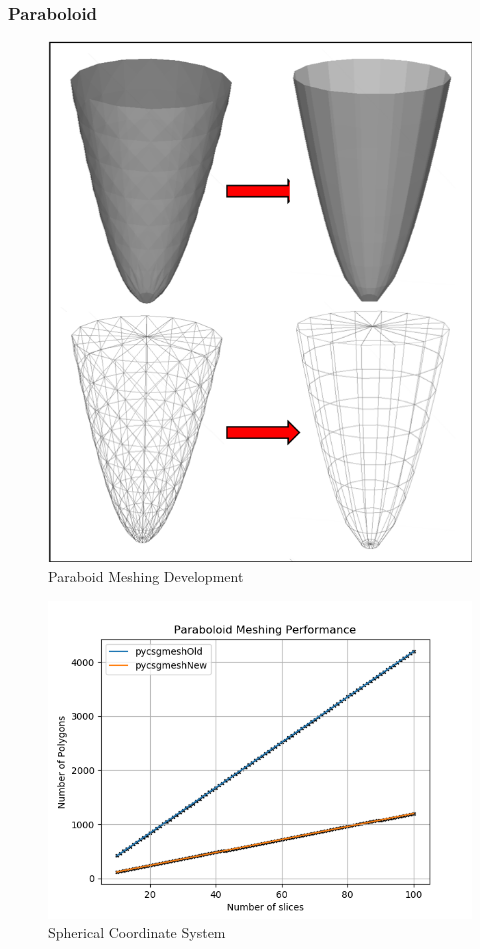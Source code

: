 \documentclass[12pt,a4paper]{article}
\begin{document}
\newpage
\subsubsection{Paraboloid}

\begin{figure}[h!]
\centering
\includegraphics[scale=0.5]{Images//Meshes//paraboloid.png}
\caption[width=\columnwidth]{Paraboid Meshing Development}
\label{para}
\end{figure}

\begin{figure}[h!]
\centering
\includegraphics[scale=0.5]{Images//Quad_fits//Paraboloid_quad.png}
\caption[width=\columnwidth]{Spherical Coordinate System}
\label{conts}
\end{figure}
\end{document}
